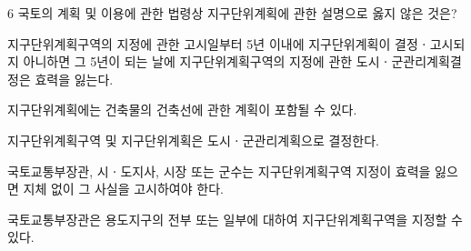 \begin{question}{6}
국토의 계획 및 이용에 관한 법령상 지구단위계획에 관한 설명으로 옳지 않은 것은?
\begin{choices}
  \item 지구단위계획구역의 지정에 관한 고시일부터 5년 이내에 지구단위계획이 결정ㆍ고시되지 아니하면 그 5년이 되는 날에 지구단위계획구역의 지정에 관한 도시ㆍ군관리계획결정은 효력을 잃는다.
  \item 지구단위계획에는 건축물의 건축선에 관한 계획이 포함될 수 있다.
  \item 지구단위계획구역 및 지구단위계획은 도시ㆍ군관리계획으로 결정한다.
  \item 국토교통부장관, 시ㆍ도지사, 시장 또는 군수는 지구단위계획구역 지정이 효력을 잃으면 지체 없이 그 사실을 고시하여야 한다.
  \item 국토교통부장관은 용도지구의 전부 또는 일부에 대하여 지구단위계획구역을 지정할 수 있다.
\end{choices}
\end{question}

